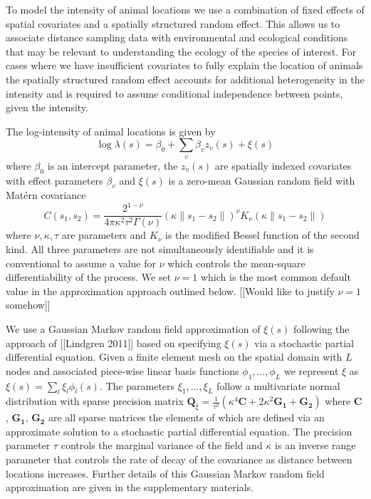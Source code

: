 \documentclass[preprint,12pt]{elsarticle}
\newcommand{\bm}{\boldsymbol}  %
\begin{document}
To model the intensity of animal locations we use a combination of fixed effects of spatial covariates and a spatially structured random effect.  This allows us to associate distance sampling data with environmental and ecological conditions that may be relevant to understanding the ecology of the species of interest.  For cases where we have insufficient covariates to fully explain the location of animals the spatially structured random effect accounts for additional heterogeneity in the intensity and is required to assume conditional independence between points, given the intensity.

The log-intensity of animal locations is given by
\begin{equation*}
\log \lambda(s) = \beta_0 + \sum_v \beta_v z_v(s) + \xi(s)
\end{equation*}
where $\beta_0$ is an intercept parameter, the $z_v(s)$ are spatially indexed covariates with effect parameters $\beta_v$ and $\xi(s)$ is a zero-mean Gaussian random field with Mat\'ern covariance
\begin{equation}
C(s_1,s_2) = \frac{2^{1-\nu}}{4\pi\kappa^2\tau^2\Gamma(\nu)}(\kappa \|s_1-s_2\|)^{\nu}K_\nu(\kappa \|s_1-s_2\|)
\end{equation}
where \(\nu, \kappa, \tau\) are parameters and \(K_{\nu}\) is the modified Bessel function of the second kind.  All three parameters are not simultaneously identifiable and it is conventional to assume a value for $\nu$ which controls the mean-square differentiability of the process.  We set $\nu = 1$ which is the most common default value in the approximation approach outlined below.  [[Would like to justify $\nu = 1$ somehow]]

We use a Gaussian Markov random field approximation of $\xi(s)$ following the approach of [[Lindgren 2011]] based on specifying $\xi(s)$ via a stochastic partial differential equation.  Given a finite element mesh on the spatial domain with $L$ nodes and associated piece-wise linear basis functions $\phi_1, \ldots, \phi_L$ we represent $\xi$ as $\xi(s) = \sum_l \xi_l \phi_l(s)$.  The parameters $\xi_1, \ldots, \xi_L$ follow a multivariate normal distribution with sparse precision matrix $\bm{Q}_{\xi} = \frac{1}{\tau^2}\left(\kappa^4\bm{C} + 2\kappa^2\bm{G_1} + \bm{G_2}\right)$ where $\bm{C}$, $\bm{G_1}$, $\bm{G_2}$ are all sparse matrices the elements of which are defined via an approximate solution to a stochastic partial differential equation. The precision parameter $\tau$ controls the marginal variance of the field and $\kappa$ is an inverse range parameter that controls the rate of decay of the covariance as distance between locations increases.  Further details of this Gaussian Markov random field approximation are given in the supplementary materials.
\end{document}
